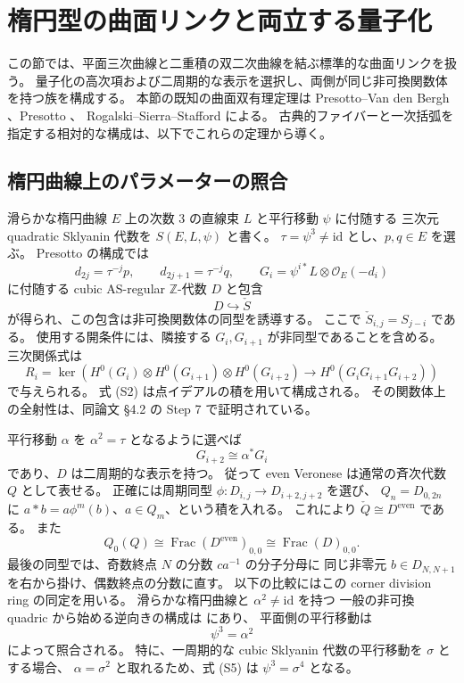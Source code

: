\section{楕円型の曲面リンクと両立する量子化}
\label{sec:nc-surface-links}\label{sec:elliptic-links}

この節では、平面三次曲線と二重積の双二次曲線を結ぶ標準的な曲面リンクを扱う。
量子化の高次項および二周期的な表示を選択し、両側が同じ非可換関数体を持つ族を構成する。
本節の既知の曲面双有理定理は Presotto--Van den Bergh
\cite{PVdB2016}、Presotto \cite{Presotto2018}、
Rogalski--Sierra--Stafford \cite{RSS2023} による。
古典的ファイバーと一次括弧を指定する相対的な構成は、以下でこれらの定理から導く。

\subsection{楕円曲線上のパラメーターの照合}

滑らかな楕円曲線 $E$ 上の次数 $3$ の直線束 $L$ と平行移動 $\psi$ に付随する
三次元 quadratic Sklyanin 代数を $S(E,L,\psi)$ と書く。
$\tau=\psi^3\ne\mathrm{id}$ とし、$p,q\in E$ を選ぶ。
Presotto \cite[定理4.4、\S4.2、式(4.7)--(4.10)]{Presotto2018} の構成では
\[
 d_{2j}=\tau^{-j}p,\qquad d_{2j+1}=\tau^{-j}q,\qquad
 G_i=\psi^{i*}L\otimes\mathcal O_E(-d_i)
 \tag{S1}
\]
に付随する cubic AS-regular $\mathbb Z$-代数 $D$ と包含
\[
 D\hookrightarrow\check S
 \tag{S2}
\]
が得られ、この包含は非可換関数体の同型を誘導する。
ここで $\check S_{i,j}=S_{j-i}$ である。
使用する開条件には、隣接する $G_i,G_{i+1}$ が非同型であることを含める。
三次関係式は
\[
 R_i=\ker\!\left(
 H^0(G_i)\otimes H^0(G_{i+1})\otimes H^0(G_{i+2})
 \longrightarrow H^0(G_iG_{i+1}G_{i+2})\right)
 \tag{S3}
\]
で与えられる。
式 (S2) は点イデアルの積を用いて構成される。
その関数体上の全射性は、同論文 \S4.2 の Step 7 で証明されている。

平行移動 $\alpha$ を $\alpha^2=\tau$ となるように選べば
\[
 G_{i+2}\cong\alpha^*G_i
 \tag{S4}
\]
であり、$D$ は二周期的な表示を持つ。
従って even Veronese は通常の斉次代数 $Q$ として表せる。
正確には周期同型 $\phi:D_{i,j}\to D_{i+2,j+2}$ を選び、
$Q_n=D_{0,2n}$ に $a*b=a\phi^m(b)$、$a\in Q_m$、という積を入れる。
これにより $\check Q\cong D^{\mathrm{even}}$ である。
また
\[
 Q_0(Q)\cong\operatorname{Frac}(D^{\mathrm{even}})_{0,0}
       \cong\operatorname{Frac}(D)_{0,0}.
\]
最後の同型では、奇数終点 $N$ の分数 $ca^{-1}$ の分子分母に
同じ非零元 $b\in D_{N,N+1}$ を右から掛け、偶数終点の分数に直す。
以下の比較にはこの corner division ring の同定を用いる。
滑らかな楕円曲線と $\alpha^2\ne\mathrm{id}$ を持つ
一般の非可換 quadric から始める逆向きの構成は
\cite[定理4.1、\S4.1、式(4.4)]{Presotto2018} にあり、
平面側の平行移動は
\[
                 \psi^3=\alpha^2
                 \tag{S5}
\]
によって照合される。
特に、一周期的な cubic Sklyanin 代数の平行移動を $\sigma$ とする場合、
$\alpha=\sigma^2$ と取れるため、式 (S5) は
$\psi^3=\sigma^4$ となる。


